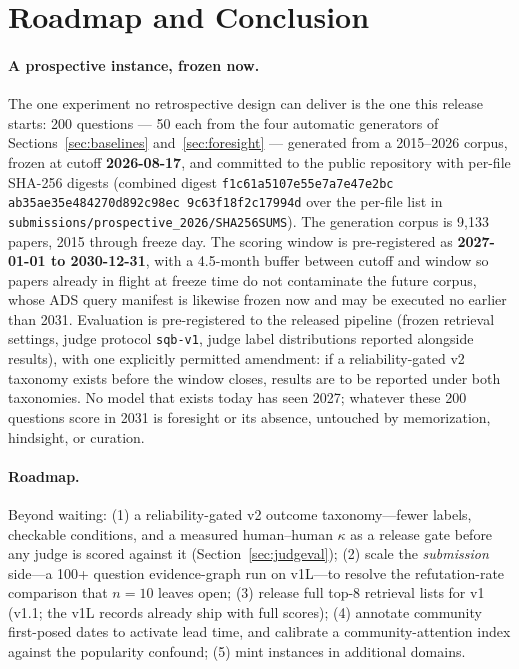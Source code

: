 \section{Roadmap and Conclusion}
\label{sec:conclusion}

\paragraph{A prospective instance, frozen now.} The one experiment no
retrospective design can deliver is the one this release starts: 200
questions --- 50 each from the four automatic generators of
Sections~\ref{sec:baselines} and~\ref{sec:foresight} --- generated from
a 2015--2026 corpus, frozen at cutoff \textbf{2026-08-17}, and
committed to the public repository with per-file SHA-256 digests
(combined digest
\texttt{f1c61a51\allowbreak 07e55e7a\allowbreak 7e47e2bc\allowbreak
ab35ae35\allowbreak e484270d\allowbreak 892c98ec\allowbreak
9c63f18f\allowbreak 2c17994d} over the per-file list in
\texttt{submissions/prospective\_2026/SHA256SUMS}). The generation
corpus is 9{,}133 papers, 2015 through freeze day. The scoring window
is pre-registered as
\textbf{2027-01-01 to 2030-12-31}, with a 4.5-month buffer between
cutoff and window so papers already in flight at freeze time do not
contaminate the future corpus, whose ADS query manifest is likewise
frozen now and may be executed no earlier than 2031. Evaluation is
pre-registered to the released pipeline (frozen retrieval settings,
judge protocol \texttt{sqb-v1}, judge label distributions reported
alongside results), with one explicitly permitted amendment: if a
reliability-gated v2 taxonomy exists before the window closes, results
are to be reported under both taxonomies. No model that exists today
has seen 2027; whatever these 200 questions score in 2031 is foresight
or its absence, untouched by memorization, hindsight, or curation.

\paragraph{Roadmap.} Beyond waiting: (1) a reliability-gated v2 outcome
taxonomy---fewer labels, checkable conditions, and a measured
human--human $\kappa$ as a release gate before any judge is scored
against it (Section~\ref{sec:judgeval}); (2) scale the
\emph{submission} side---a 100+ question evidence-graph run on v1L---to
resolve the refutation-rate comparison that $n=10$ leaves open;
(3) release full top-8 retrieval lists for v1 (v1.1; the v1L records
already ship with full scores); (4) annotate community first-posed
dates to activate lead time, and calibrate a community-attention index
against the popularity confound; (5) mint instances in additional
domains.


